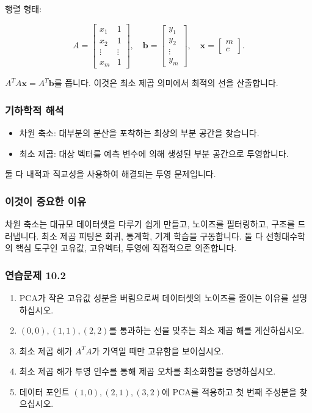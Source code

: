 \documentclass[
  12pt,
  a4paper,
]{article}
\begin{document}
행렬 형태:

\[A = \begin{bmatrix}
x_1 & 1 \\
x_2 & 1 \\
\vdots & \vdots \\
x_m & 1
\end{bmatrix},
\quad
\mathbf{b} =
\begin{bmatrix}
y_1 \\
y_2 \\
\vdots \\
y_m \end{bmatrix},
\quad
\mathbf{x} =
\begin{bmatrix}
m \\
c \end{bmatrix}.\]

\(A^T A \mathbf{x} = A^T \mathbf{b}\)를 풉니다. 이것은 최소 제곱 의미에서 최적의 선을 산출합니다.

\subsubsection{기하학적 해석}\label{geometric-interpretation-24}

\begin{itemize}
\item
  차원 축소: 대부분의 분산을 포착하는 최상의 부분 공간을 찾습니다.
\item
  최소 제곱: 대상 벡터를 예측 변수에 의해 생성된 부분 공간으로 투영합니다.
\end{itemize}

둘 다 내적과 직교성을 사용하여 해결되는 투영 문제입니다.

\subsubsection{이것이 중요한 이유}\label{why-this-matters-37}

차원 축소는 대규모 데이터셋을 다루기 쉽게 만들고, 노이즈를 필터링하고, 구조를 드러냅니다. 최소 제곱 피팅은 회귀, 통계학, 기계 학습을 구동합니다. 둘 다 선형대수학의 핵심 도구인 고유값, 고유벡터, 투영에 직접적으로 의존합니다.

\subsubsection{연습문제 10.2}\label{exercises-102}

\begin{enumerate}
\def\labelenumi{\arabic{enumi}.}
\item
  PCA가 작은 고유값 성분을 버림으로써 데이터셋의 노이즈를 줄이는 이유를 설명하십시오.
\item
  \((0,0), (1,1), (2,2)\)를 통과하는 선을 맞추는 최소 제곱 해를 계산하십시오.
\item
  최소 제곱 해가 \(A^T A\)가 가역일 때만 고유함을 보이십시오.
\item
  최소 제곱 해가 투영 인수를 통해 제곱 오차를 최소화함을 증명하십시오.
\item
  데이터 포인트 \((1,0), (2,1), (3,2)\)에 PCA를 적용하고 첫 번째 주성분을 찾으십시오.
\end{enumerate}
\end{document}
